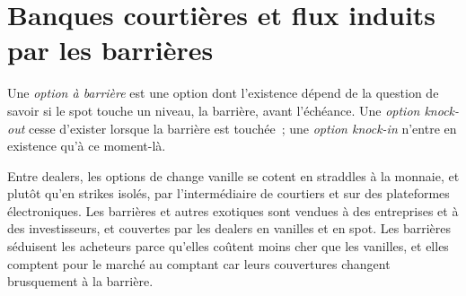 \section{Banques courtières et flux induits par les barrières}

\begin{definition}\label{def:m2:the-fx-options-market:barrier}
Une \emph{option à barrière} est une option dont l'existence
dépend de la question de savoir si le spot touche un niveau, la barrière, avant l'échéance. Une
\emph{option knock-out} cesse d'exister lorsque la barrière
est touchée~; une \emph{option knock-in} n'entre en existence
qu'à ce moment-là.
\end{definition}

Entre dealers, les options de change vanille se cotent en straddles à la monnaie,  et  plutôt qu'en strikes isolés, par l'intermédiaire de courtiers et sur des plateformes
électroniques. Les barrières et autres exotiques sont vendues à des entreprises et à des
investisseurs, et couvertes par les dealers en vanilles et en spot. Les barrières séduisent
les acheteurs parce qu'elles coûtent moins cher que les vanilles, et elles comptent pour le marché au comptant
car leurs couvertures changent brusquement à la barrière.

